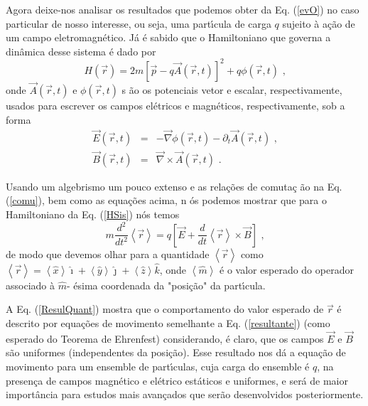 \documentclass[twocolumn]{rbef}
\newcommand{\1}{\mathbbm{1}}
\begin{document}
Agora deixe-nos analisar os resultados que podemos obter da
Eq. (\ref{evO}) no caso particular de nosso interesse, ou seja, uma
part\'{\i}cula de carga $q$ sujeito à ação de um campo
eletromagn\'{e}tico. Já é sabido que o Hamiltoniano que governa a
dinâmica desse sistema é dado por \cite{Sakuray:book}
\begin{equation}
  H\left( \vec{r}\right) =2m\left[ \vec{p}-q\vec{A}\left( \vec{r},t\right) %
  \right] ^{2}+q\phi \left( \vec{r},t\right) \text{ ,}  \label{HSis}
\end{equation}%
onde $\vec{A}\left( \vec{r},t\right) $ e $\phi \left( \vec{r},t\right) $
s%
\~{a}o os potenciais vetor e escalar, respectivamente, usados para
escrever os campos el\'{e}tricos e magn\'{e}ticos, respectivamente, sob
a forma%
\begin{eqnarray}
  \vec{E}\left( \vec{r},t\right)  &=&-\vec{\nabla}\phi \left( \vec{r},t\right)
                                      -\partial _{t}\vec{A}\left( \vec{r},t\right) \text{ ,}  \label{E} \\
  \vec{B}\left( \vec{r},t\right)  &=&\vec{\nabla}\times \vec{A}\left( \vec{r}%
                                      ,t\right)  \text{ .} \label{B}
\end{eqnarray}

Usando um algebrismo um pouco extenso e as rela\c{c}\~{o}es de
comuta\c{c}%
\~{a}o na Eq. (\ref{comu}), bem como as equa\c{c}\~{o}es acima, n%
\'{o}s podemos mostrar que para o Hamiltoniano da Eq. (\ref{HSis})
n\'{o}s temos
\begin{equation}
  m\frac{d^{2}}{dt^{2}}\left\langle \vec{r}\right\rangle =q\left[ \vec{E}+%
    \frac{d}{dt}\left\langle \vec{r}\right\rangle \times \vec{B}\right] \text{ ,}
  \label{ResulQuant}
\end{equation}%
de modo que devemos olhar para a quantidade $\left\langle \vec{r}%
\right\rangle $ como
$\left\langle \vec{r}\right\rangle =\left\langle \hat{x}%
\right\rangle \hat{\imath}+\left\langle \hat{y}\right\rangle
\hat{\jmath}%
+\left\langle \hat{z}\right\rangle \hat{k}$, onde $\left\langle \hat{m}%
\right\rangle $ \'{e} o valor esperado do operador associado \`{a}
$\hat{m}$-%
\'{e}sima coordenada da "posi\c{c}\~{a}o" da part\'{\i}cula.

A Eq. (\ref{ResulQuant}) mostra que o comportamento do valor esperado de
$\vec{r}$ é descrito por equações de movimento semelhante a
Eq. (\ref{resultante}) (como esperado do Teorema de Ehrenfest)
considerando, é claro, que os campos $\vec{E}$ e $\vec{B}$ s\~{a}o
uniformes (independentes da posi\c{c}\~{a}o). Esse resultado nos d\'{a}
a equa\c{c}\~{a}o de movimento para um ensemble de part\'{\i}culas, cuja
carga do ensemble \'{e} $q$, na presen\c{c}a de campos magn\'{e}tico e
el\'{e}trico est\'{a}ticos e uniformes, e será de maior import\^{a}ncia
para estudos mais avançados que serão desenvolvidos posteriormente.
\end{document}
